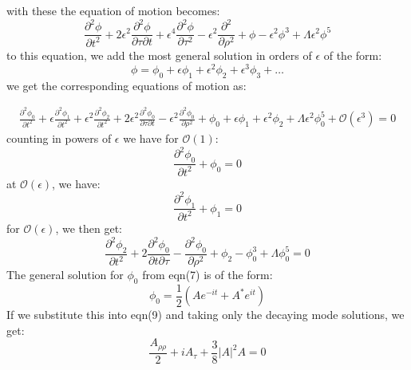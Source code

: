 \documentclass{article}
\begin{document}
with these the equation of motion becomes:
\begin{equation}
\frac{\partial^{2}\phi}{\partial t^{2}} + 2\epsilon^{2}\frac{\partial^{2} \phi}{\partial \tau \partial t} + \epsilon^{4} \frac{\partial^{2}\phi}{\partial \tau^{2}} - \epsilon^{2}\frac{\partial^{2}}{\partial \rho^{2}} + \phi -\epsilon^{2} \phi^{3} + \Lambda \epsilon^{2} \phi^{5}
\end{equation}
to this equation, we add the most general solution in orders  of $\epsilon$ of the form:
\begin{equation}
\phi = \phi_{0} + \epsilon\phi_{1} + \epsilon^{2}\phi_{2} + \epsilon^{3}\phi_{3} + \dotsc
\end{equation}
we get the corresponding equations of motion as:

\begin{equation}
\begin{split}
\frac{\partial^{2}\phi_{0}}{\partial t^{2}} + \epsilon \frac{\partial^{2}\phi_{1}}{\partial t^{2}} + \epsilon^{2}\frac{\partial^{2}\phi_{2}}{\partial t^{2}} + 2 \epsilon^{2} \frac{\partial^{2}\phi_{0}}{\partial \tau \partial t} - \epsilon^{2} \frac{\partial^{2}\phi_{0}}{\partial \rho^{2}} +\phi_{0} + \epsilon \phi_{1} + \epsilon^{2} \phi_{2} + \Lambda \epsilon^{2}\phi_{0}^{5}+ \mathcal{O}(\epsilon^{3})  = 0
\end{split}
\end{equation}
counting in powers of $\epsilon$ we have for $\mathcal{O}(1)$:
\begin{equation}
\frac{\partial^{2}\phi_{0}}{\partial t^{2}} + \phi_{0} = 0
\end{equation}
at $\mathcal{O}(\epsilon)$, we have:
\begin{equation}
\frac{\partial^{2}\phi_{1}}{\partial t^{2}} + \phi_{1} = 0
\end{equation}
for $\mathcal{O}(\epsilon)$, we then get:
\begin{equation}
\frac{\partial^{2}\phi_{2}}{\partial t^{2}}  + 2\frac{\partial^{2}\phi_{0}}{\partial t \partial \tau} - \frac{\partial^{2}\phi_{0}}{\partial \rho^{2}} + \phi_{2} - \phi_{0}^{3} + \Lambda \phi_{0}^{5} = 0
\end{equation}
The general solution for $\phi_{0}$ from eqn(7) is of the form:
\begin{equation}
\phi_{0} = \frac{1}{2}(Ae^{-it}+A^{*}e^{it})
\end{equation}
If we substitute this into eqn(9) and taking only the decaying mode solutions, we get:
\begin{equation}
\frac{A_{\rho \rho}}{2} + i A_{\tau}  + \frac{3}{8} |A|^{2}A = 0
\end{equation}
\end{document}
